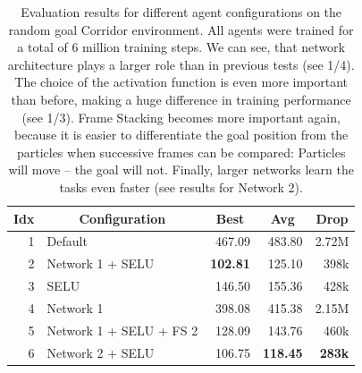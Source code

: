 \begin{table}[htp]
    \begin{center}
        \begin{tabular}{rlrrr}
            \toprule
            \multicolumn{1}{c}{Idx} & \multicolumn{1}{c}{Configuration} & \multicolumn{1}{c}{Best} & \multicolumn{1}{c}{Avg} & \multicolumn{1}{c}{Drop}\\
            \midrule
            1 & Default & 467.09 & 483.80 & 2.72M \\
            2 & Network 1 + SELU & \textbf{102.81} & 125.10 & 398k \\
            3 & SELU & 146.50 & 155.36 & 428k \\
            4 & Network 1 & 398.08 & 415.38 & 2.15M \\ 
            5 & Network 1 + SELU + FS 2 & 128.09 & 143.76 & 460k \\
            6 & Network 2 + SELU & 106.75 & \textbf{118.45} & \textbf{283k} \\
            \bottomrule
        \end{tabular}
    \end{center}
    \caption[Evaluation Results for Agents on the Random Goal Corridor Environment]{Evaluation results for different agent configurations on the random goal Corridor environment. All agents were trained for a total of 6 million training steps. We can see, that network architecture plays a larger role than in previous tests (see 1/4). The choice of the activation function is even more important than before, making a huge difference in training performance (see 1/3). Frame Stacking becomes more important again, because it is easier to differentiate the goal position from the particles when successive frames can be compared: Particles will move -- the goal will not. Finally, larger networks learn the tasks even faster (see results for Network 2).} \label{tab:Eval/RandomGoal/Maze0318}
\end{table}

